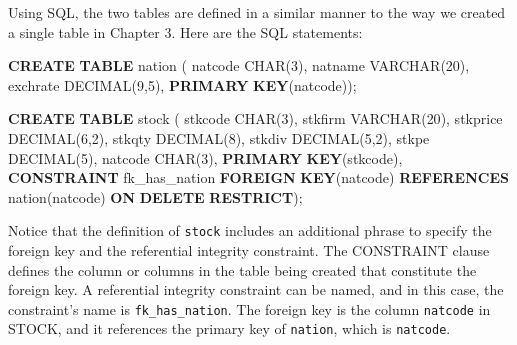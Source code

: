 \documentclass[
]{article}
\newenvironment{Shaded}{\begin{snugshade}}{\end{snugshade}}
\newcommand{\DataTypeTok}[1]{\textcolor[rgb]{0.13,0.29,0.53}{#1}}
\newcommand{\DecValTok}[1]{\textcolor[rgb]{0.00,0.00,0.81}{#1}}
\newcommand{\KeywordTok}[1]{\textcolor[rgb]{0.13,0.29,0.53}{\textbf{#1}}}
\newcommand{\NormalTok}[1]{#1}
\begin{document}
Using SQL, the two tables are defined in a similar manner to the way we
created a single table in Chapter 3. Here are the SQL statements:

\begin{Shaded}
\begin{Highlighting}[]
\KeywordTok{CREATE} \KeywordTok{TABLE}\NormalTok{ nation (}
\NormalTok{  natcode }\DataTypeTok{CHAR}\NormalTok{(}\DecValTok{3}\NormalTok{),}
\NormalTok{  natname }\DataTypeTok{VARCHAR}\NormalTok{(}\DecValTok{20}\NormalTok{),}
\NormalTok{  exchrate }\DataTypeTok{DECIMAL}\NormalTok{(}\DecValTok{9}\NormalTok{,}\DecValTok{5}\NormalTok{),}
  \KeywordTok{PRIMARY} \KeywordTok{KEY}\NormalTok{(natcode));}
\end{Highlighting}
\end{Shaded}

\begin{Shaded}
\begin{Highlighting}[]
\KeywordTok{CREATE} \KeywordTok{TABLE}\NormalTok{ stock (}
\NormalTok{  stkcode }\DataTypeTok{CHAR}\NormalTok{(}\DecValTok{3}\NormalTok{),}
\NormalTok{  stkfirm }\DataTypeTok{VARCHAR}\NormalTok{(}\DecValTok{20}\NormalTok{),}
\NormalTok{  stkprice }\DataTypeTok{DECIMAL}\NormalTok{(}\DecValTok{6}\NormalTok{,}\DecValTok{2}\NormalTok{),}
\NormalTok{  stkqty }\DataTypeTok{DECIMAL}\NormalTok{(}\DecValTok{8}\NormalTok{),}
\NormalTok{  stkdiv }\DataTypeTok{DECIMAL}\NormalTok{(}\DecValTok{5}\NormalTok{,}\DecValTok{2}\NormalTok{),}
\NormalTok{  stkpe }\DataTypeTok{DECIMAL}\NormalTok{(}\DecValTok{5}\NormalTok{),}
\NormalTok{  natcode }\DataTypeTok{CHAR}\NormalTok{(}\DecValTok{3}\NormalTok{),}
  \KeywordTok{PRIMARY} \KeywordTok{KEY}\NormalTok{(stkcode),}
  \KeywordTok{CONSTRAINT}\NormalTok{ fk\_has\_nation }\KeywordTok{FOREIGN} \KeywordTok{KEY}\NormalTok{(natcode)}
  \KeywordTok{REFERENCES}\NormalTok{ nation(natcode) }\KeywordTok{ON} \KeywordTok{DELETE} \KeywordTok{RESTRICT}\NormalTok{);}
\end{Highlighting}
\end{Shaded}

Notice that the definition of \texttt{stock} includes an additional phrase to
specify the foreign key and the referential integrity constraint. The
CONSTRAINT clause defines the column or columns in the table being
created that constitute the foreign key. A referential integrity
constraint can be named, and in this case, the constraint's name is
\texttt{fk\_has\_nation}. The foreign key is the column \texttt{natcode} in STOCK, and
it references the primary key of \texttt{nation}, which is \texttt{natcode}.
\end{document}
